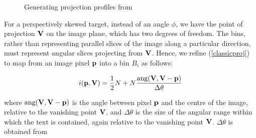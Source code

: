 \begin{figure}[t]
\centering
\begin{center}
\end{center}
\caption{Generating projection profiles from }
\label{projprofsfig}
\end{figure}




For a perspectively skewed target, instead of an angle $\phi$, we have the point of projection
${ \bf V }$ on the image plane, which has two degrees of freedom. The bins,
rather than representing parallel slices of the image along a particular
direction, must represent angular slices projecting from ${ \bf V }$.  Hence, we
refine (\ref{classicproj}) to map from an image pixel ${ \bf p }$ into a bin
$B_i$ as follows:


\begin{equation} \label{persproj} i( { \bf p,{ \bf V } } ) = \frac{1}{2} N + N \frac{ \mbox{ang}({ \bf V },{ \bf V }-{ \bf p }) }{ \Delta \theta } \end{equation}

{ \parindent 0mm 
where $\mbox{ang}({ \bf V },{ \bf V }-{ \bf p })$ is the angle
between pixel ${ \bf p }$ and the centre of the image, relative to the vanishing
point ${ \bf V }$, and $\Delta \theta$ is the size of the angular range within
which the text is contained, again relative to the vanishing point
${ \bf V }$. $ \Delta \theta$ is obtained from 
}

